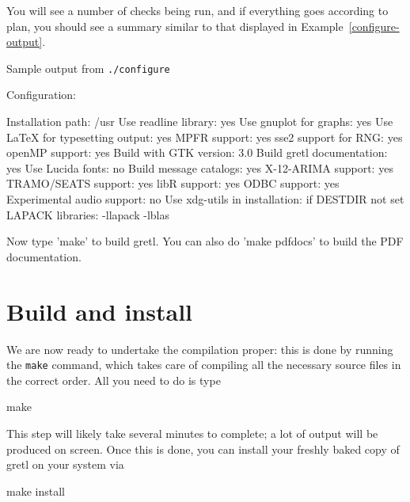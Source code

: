 You will see a number of checks being run, and if everything goes
according to plan, you should see a summary similar to that displayed
in Example~\ref{configure-output}.

\begin{script}[htbp]
  \caption{Sample output from \texttt{./configure}}
  \label{configure-output}
\begin{scode}
Configuration:

  Installation path:                      /usr
  Use readline library:                   yes
  Use gnuplot for graphs:                 yes
  Use LaTeX for typesetting output:       yes
  MPFR support:                           yes
  sse2 support for RNG:                   yes
  openMP support:                         yes
  Build with GTK version:                 3.0
  Build gretl documentation:              yes
  Use Lucida fonts:                       no
  Build message catalogs:                 yes
  X-12-ARIMA support:                     yes
  TRAMO/SEATS support:                    yes
  libR support:                           yes
  ODBC support:                           yes
  Experimental audio support:             no
  Use xdg-utils in installation:          if DESTDIR not set
  LAPACK libraries:
    -llapack -lblas

Now type 'make' to build gretl.
You can also do 'make pdfdocs' to build the PDF documentation.
\end{scode}
\end{script}



\section{Build and install}

We are now ready to undertake the compilation proper: this is done by
running the \texttt{make} command, which takes care of compiling all
the necessary source files in the correct order. All you need to do is
type
\begin{code}
make 
\end{code}

This step will likely take several minutes to complete; a lot of
output will be produced on screen. Once this is done, you can install
your freshly baked copy of gretl on your system via
\begin{code}
make install
\end{code}

